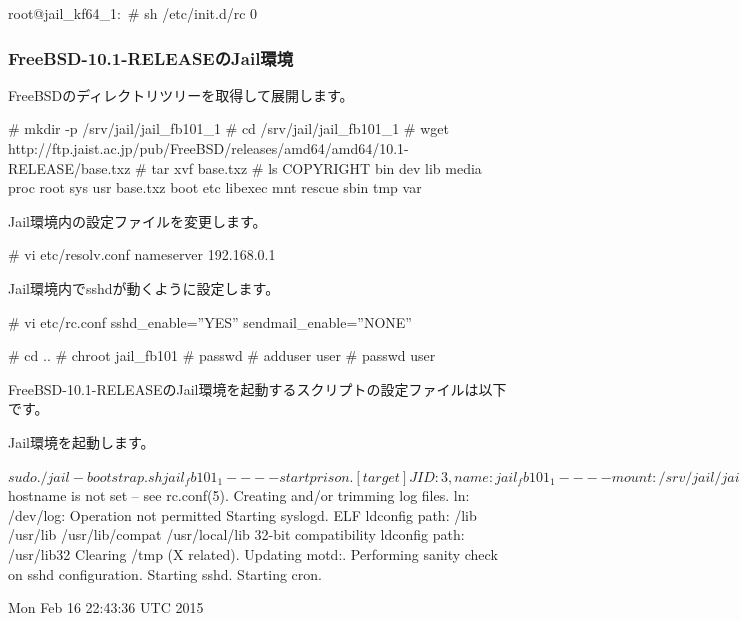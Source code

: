 \documentclass[mingoth,a4paper]{jsarticle}
\begin{document}
\begin{commandline}
root@jail_kf64_1:~# sh /etc/init.d/rc 0
\end{commandline}


\subsubsection{FreeBSD-10.1-RELEASEのJail環境}

FreeBSDのディレクトリツリーを取得して展開します。

\begin{commandline}
# mkdir -p /srv/jail/jail_fb101_1
# cd /srv/jail/jail_fb101_1
# wget http://ftp.jaist.ac.jp/pub/FreeBSD/releases/amd64/amd64/10.1-RELEASE/base.txz
# tar xvf base.txz
# ls
COPYRIGHT  bin dev  lib      media  proc    root  sys  usr
base.txz   boot  etc  libexec  mnt    rescue  sbin  tmp  var
\end{commandline}

Jail環境内の設定ファイルを変更します。

\begin{commandline}
# vi etc/resolv.conf
nameserver 192.168.0.1
\end{commandline}

Jail環境内でsshdが動くように設定します。

\begin{commandline}
# vi etc/rc.conf
sshd_enable=''YES''
sendmail_enable=''NONE''

# cd ..
# chroot jail_fb101
# passwd
# adduser user
# passwd user
\end{commandline}

FreeBSD-10.1-RELEASEのJail環境を起動するスクリプトの設定ファイルは以下です。


Jail環境を起動します。

\begin{commandline}
$ sudo ./jail-bootstrap.sh jail_fb101_1

----
start prison.
[target] JID: 3, name: jail_fb101_1
----

mount: /srv/jail/jail_fb101_1/usr/src/sys: No such file or directory
mount: /srv/jail/jail_fb101_1/run: No such file or directory
devfs rule: ioctl DEVFSIO_SAPPLY: No such process
/etc/rc: WARNING: $hostname is not set -- see rc.conf(5).
Creating and/or trimming log files.
ln: /dev/log: Operation not permitted
Starting syslogd.
ELF ldconfig path: /lib /usr/lib /usr/lib/compat /usr/local/lib
32-bit compatibility ldconfig path: /usr/lib32
Clearing /tmp (X related).
Updating motd:.
Performing sanity check on sshd configuration.
Starting sshd.
Starting cron.

Mon Feb 16 22:43:36 UTC 2015
\end{commandline}
\end{document}
